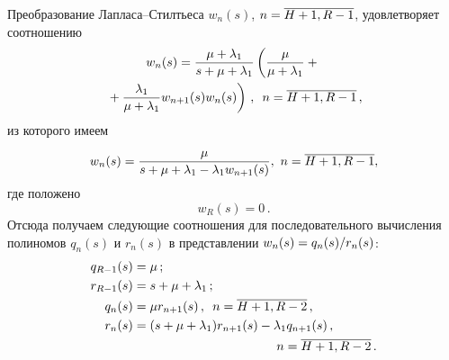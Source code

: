 \begin{multicols}{2}
Преобразование Лап\-ла\-са--Стилть\-еса $w_{n}(s)$, $n\hm=\overline{H+1,R-1}$, удовлетворяет соотношению
\begin{multline*}
w_{n}(s) = \displaystyle\frac{\displaystyle \mu+\lambda_1 \mathstrut}{\displaystyle s + \mu+\lambda_1\mathstrut}
 \left( \displaystyle\frac{\displaystyle \mu \mathstrut}{\displaystyle \mu+\lambda_1\mathstrut} +{}\right.\\
\left.{}+ \displaystyle\frac{\displaystyle \lambda_1 \mathstrut}{\displaystyle \mu+\lambda_1\mathstrut} w_{n+1}(s)
w_{n}(s) \right)\,,\enskip n=\overline{H+1,R-1}\,,
\end{multline*}
из которого имеем
\begin{equation*}
w_{n}(s) = \displaystyle\frac{\displaystyle \mu\mathstrut}{\displaystyle s + \mu + \lambda_1 - \lambda_1 w_{n+1}(s)\mathstrut},\  
n=\overline{H+1,R-1},
\end{equation*}
где положено
\begin{equation*}
w_{R}(s) = 0\,.
\end{equation*}
Отсюда получаем следующие соотношения для последовательного
вычисления полиномов $q_n(s)$ и $r_n(s)$ в представлении
$w_n(s)\hm=q_n(s)/r_n(s)$:
\begin{align*}
q_{R-1}(s) &= \mu \,;
\\
r_{R-1}(s) &= s + \mu + \lambda_1 \,;
\\
q_{n}(s) &= \mu r_{n+1}(s) \,,\enskip n=\overline{H+1,R-2}\,,
\\
r_{n}(s) &= (s + \mu + \lambda_1) r_{n+1}(s) - \lambda_1 q_{n+1}(s)\,,\\  
&\hspace*{40mm}n=\overline{H+1,R-2}\,.
\end{align*}


\end{multicols}
